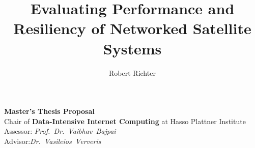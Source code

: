\documentclass[a4, 12pt]{article}
\begin{document}
\author{Robert Richter}
\title{Evaluating Performance and Resiliency of Networked Satellite Systems}
\maketitle


\noindent
\textbf{Master's Thesis Proposal} \\
Chair of \textbf{Data-Intensive Internet Computing} at Hasso Plattner Institute \\

\noindent
Assessor: \textit{Prof.~Dr.~Vaibhav~Bajpai} \\
Advisor:\textit{Dr.~Vasileios~Ververis}

\tableofcontents
\newpage



\newpage

\printbibliography
\end{document}
